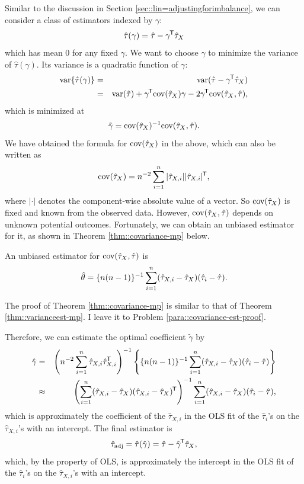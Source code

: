 Similar to the discussion in Section \ref{sec::lin=adjustingforimbalance}, we can consider a class of estimators indexed by $\gamma$:
$$
\hat{\tau}(\gamma) = \hat{\tau} - \gamma^{\mkern-1.5mu\mathsf{T}} \hat{\tau}_X 
$$
which has mean $0$ for any fixed $\gamma$. We want to choose $\gamma$ to minimize the variance of $\hat{\tau}(\gamma)$. Its variance is a quadratic function of $\gamma$:
\begin{eqnarray*}
\textup{var}\{ \hat{\tau}(\gamma) \} &=&   \textup{var}(\hat{\tau} - \gamma^{\mkern-1.5mu\mathsf{T}} \hat{\tau}_X ) \\
&=&  \textup{var}(\hat{\tau}  ) + \gamma^{\mkern-1.5mu\mathsf{T}} \textup{cov}(\hat{\tau}_X   ) \gamma - 2\gamma^{\mkern-1.5mu\mathsf{T}} \textup{cov}( \hat{\tau}_X ,  \hat{\tau}  ),
\end{eqnarray*}
which is minimized at 
$$
\tilde{\gamma} = \textup{cov}(\hat{\tau}_X   )^{-1}  \textup{cov}( \hat{\tau}_X ,  \hat{\tau}  ).
$$
We have obtained the formula for $\textup{cov}(\hat{\tau}_X   ) $ in the above, which can also be written as 
$$
\textup{cov}(\hat{\tau}_X   ) = n^{-2} \sum_{i=1}^n |  \hat{\tau}_{X,i}  |  |\hat{\tau}_{X,i}  | ^{\mkern-1.5mu\mathsf{T}},
$$
where $| \cdot | $ denotes the component-wise absolute value of a vector. So $\textup{cov}(\hat{\tau}_X   ) $ is fixed and known from the observed data. However,  $\textup{cov}( \hat{\tau}_X ,  \hat{\tau}  )$ depends on unknown potential outcomes. Fortunately, we can obtain an unbiased estimator for it, as shown in Theorem \ref{thm::covariance-mp} below.

\begin{theorem}\label{thm::covariance-mp}
An unbiased estimator for $\textup{cov}( \hat{\tau}_X ,  \hat{\tau}  )$ is
$$
\hat{\theta} = \{n(n-1)  \}^{-1} \sum_{i=1}^n ( \hat{\tau}_{X,i}  -  \hat{\tau}_{X} ) (   \hat{\tau}_i -  \hat{\tau}   ).
$$
\end{theorem}

The proof of Theorem \ref{thm::covariance-mp} is similar to that of Theorem \ref{thm::varianceest-mp}. I leave it to Problem \ref{para::covariance-est-proof}. 


Therefore, we can estimate the optimal coefficient $\tilde{\gamma}$ by
\begin{eqnarray*}
\hat{\gamma} &=&  \left( n^{-2} \sum_{i=1}^n \hat{\tau}_{X,i}   \hat{\tau}_{X,i}  ^{\mkern-1.5mu\mathsf{T}}  \right)^{-1}
\left\{ \{n(n-1)  \}^{-1} \sum_{i=1}^n (\hat{\tau}_{X,i}  -  \hat{\tau}_X )(   \hat{\tau}_i -  \hat{\tau}   ) \right\} \\
&\approx &  \left(  \sum_{i=1}^n(  \hat{\tau}_{X,i}   - \hat{\tau}_X ) ( \hat{\tau}_{X,i}  -  \hat{\tau}_X  )^{\mkern-1.5mu\mathsf{T}}  \right)^{-1}
  \sum_{i=1}^n (\hat{\tau}_{X,i}  -  \hat{\tau}_X ) (   \hat{\tau}_i -  \hat{\tau}   )  ,
\end{eqnarray*}
which is approximately the coefficient of the $\hat{\tau}_{X,i}$ in the OLS fit of the $\hat{\tau}_i $'s on the $\hat{\tau}_{X,i} $'s with an intercept. The final estimator is
$$
\hat{\tau}_{\text{adj}} = 
\hat{\tau}( \hat{\gamma} ) = \hat{\tau} - \hat{\gamma} ^{\mkern-1.5mu\mathsf{T}} \hat{\tau}_X  ,
$$
which, by the property of OLS, is approximately the intercept in the OLS fit of the $\hat{\tau}_i $'s on the $\hat{\tau}_{X,i} $'s with an intercept.


